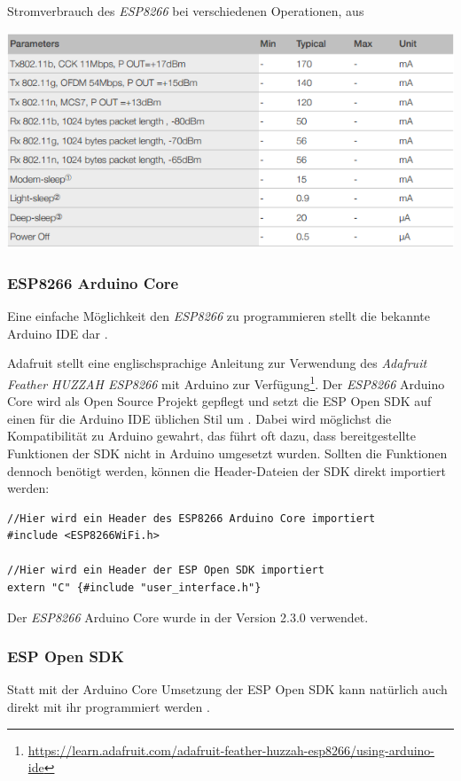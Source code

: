 \begin{table}[h]
  \centering
  \caption{Stromverbrauch des \emph{ESP8266} bei verschiedenen Operationen, aus \cite{espressif2017esp8266}}
	\includegraphics[width=\textwidth]{images/esppower.png}

  \label{table:esppower}
\end{table}


\subsubsection{ESP8266 Arduino Core}
Eine einfache Möglichkeit den \emph{ESP8266} zu programmieren stellt die bekannte Arduino IDE dar \cite{banzi2017arduino}.

Adafruit stellt eine englischsprachige Anleitung zur Verwendung des \textit{Adafruit Feather HUZZAH ESP8266} mit Arduino zur Verfügung\footnote{\url{https://learn.adafruit.com/adafruit-feather-huzzah-esp8266/using-arduino-ide}}.
Der \emph{ESP8266} Arduino Core wird als Open Source Projekt gepflegt und setzt die ESP Open SDK auf einen für die Arduino IDE üblichen Stil um \cite{arduino2017core}. 
Dabei wird möglichst die Kompatibilität zu Arduino gewahrt, das führt oft dazu, dass bereitgestellte Funktionen der SDK nicht in Arduino umgesetzt wurden.
Sollten die Funktionen dennoch benötigt werden, können die Header-Dateien der SDK direkt importiert werden:

\begin{verbatim}
//Hier wird ein Header des ESP8266 Arduino Core importiert
#include <ESP8266WiFi.h> 

//Hier wird ein Header der ESP Open SDK importiert
extern "C" {#include "user_interface.h"} 
\end{verbatim}

Der \emph{ESP8266} Arduino Core wurde in der Version 2.3.0 verwendet.

\subsubsection{ESP Open SDK}
Statt mit der Arduino Core Umsetzung der ESP Open SDK kann natürlich auch direkt mit ihr programmiert werden \cite{esp2017open}. 

